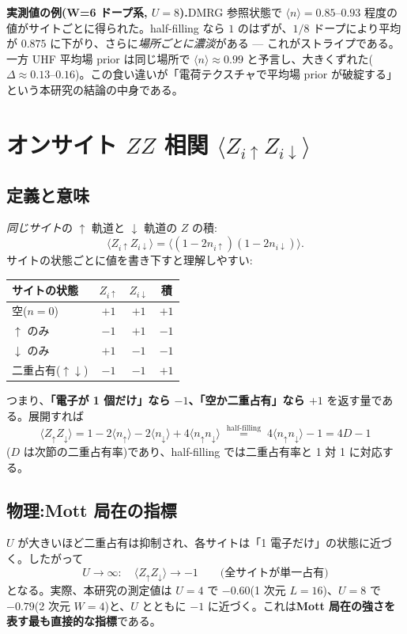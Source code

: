 \documentclass[11pt,a4paper]{ltjsarticle}
\newcommand{\ev}[1]{\langle #1\rangle}
\newcommand{\up}{\uparrow}
\newcommand{\dn}{\downarrow}
\begin{document}
\begin{exbox}
\textbf{実測値の例(W=6 ドープ系, $U=8$).}DMRG 参照状態で $\ev{n}=0.85$--$0.93$ 程度の値がサイトごとに得られた。half-filling なら $1$ のはずが、$1/8$ ドープにより平均が $0.875$ に下がり、さらに\emph{場所ごとに濃淡}がある — これがストライプである。一方 UHF 平均場 prior は同じ場所で $\ev{n}\approx0.99$ と予言し、大きくずれた($\Delta\approx0.13$--$0.16$)。この食い違いが「電荷テクスチャで平均場 prior が破綻する」という本研究の結論の中身である。
\end{exbox}

\section{オンサイト $ZZ$ 相関 $\ev{Z_{i\up}Z_{i\dn}}$}
\label{sec:zz-onsite}

\subsection{定義と意味}
\emph{同じサイト}の $\up$ 軌道と $\dn$ 軌道の $Z$ の積:
\begin{equation}
  \ev{Z_{i\up}Z_{i\dn}} = \ev{(1-2n_{i\up})(1-2n_{i\dn})}.
\end{equation}
サイトの状態ごとに値を書き下すと理解しやすい:
\begin{center}
\begin{tabular}{@{}lccc@{}}
\toprule
サイトの状態 & $Z_{i\up}$ & $Z_{i\dn}$ & 積 \\
\midrule
空($n=0$) & $+1$ & $+1$ & $+1$ \\
$\up$ のみ & $-1$ & $+1$ & $-1$ \\
$\dn$ のみ & $+1$ & $-1$ & $-1$ \\
二重占有($\up\dn$) & $-1$ & $-1$ & $+1$ \\
\bottomrule
\end{tabular}
\end{center}
つまり、\textbf{「電子が 1 個だけ」なら $-1$、「空か二重占有」なら $+1$} を返す量である。展開すれば
\begin{equation}
  \ev{Z_\up Z_\dn} = 1 - 2\ev{n_\up} - 2\ev{n_\dn} + 4\ev{n_\up n_\dn}
  \;\overset{\text{half-filling}}{=}\; 4\ev{n_\up n_\dn} - 1 = 4D - 1
\end{equation}
($D$ は次節の二重占有率)であり、half-filling では二重占有率と 1 対 1 に対応する。

\subsection{物理:Mott 局在の指標}
$U$ が大きいほど二重占有は抑制され、各サイトは「1 電子だけ」の状態に近づく。したがって
\begin{equation}
  U\to\infty:\quad \ev{Z_\up Z_\dn}\to -1\qquad\text{(全サイトが単一占有)}
\end{equation}
となる。実際、本研究の測定値は $U=4$ で $-0.60$(1 次元 $L=16$)、$U=8$ で $-0.79$(2 次元 $W=4$)と、$U$ とともに $-1$ に近づく。これは\textbf{Mott 局在の強さを表す最も直接的な指標}である。
\end{document}
